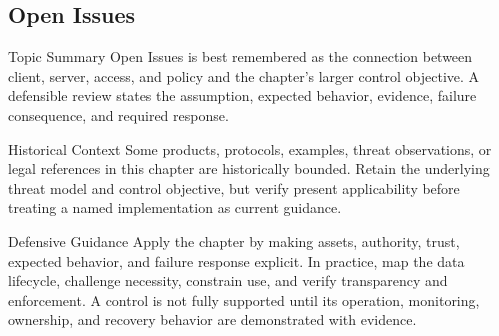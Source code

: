 \documentclass[11pt,letterpaper]{article}
\begin{document}
\subsection*{Open Issues}
\begin{CornellNotesTable}
\end{CornellNotesTable}
\begin{CornellSummaryBox}{Topic Summary}
Open Issues is best remembered as the connection between client, server, access, and policy and the chapter's larger control objective. A defensible review states the assumption, expected behavior, evidence, failure consequence, and required response.
\end{CornellSummaryBox}
\begin{CornellWarningBox}{Historical Context}
Some products, protocols, examples, threat observations, or legal references in this chapter are historically bounded. Retain the underlying threat model and control objective, but verify present applicability before treating a named implementation as current guidance.
\end{CornellWarningBox}
\begin{CornellOverviewBox}{Defensive Guidance}
Apply the chapter by making assets, authority, trust, expected behavior, and failure response explicit. In practice, map the data lifecycle, challenge necessity, constrain use, and verify transparency and enforcement. A control is not fully supported until its operation, monitoring, ownership, and recovery behavior are demonstrated with evidence.
\end{CornellOverviewBox}
\end{document}
